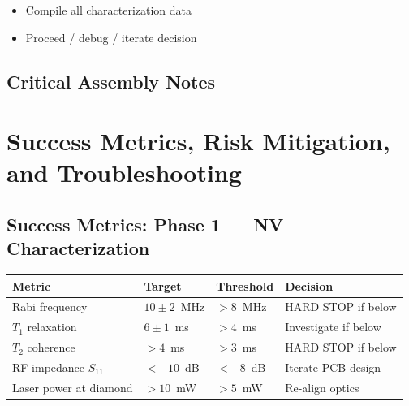 \documentclass[11pt,a4paper,openany]{book}
\begin{document}
\begin{itemize}[nosep]
  \item Compile all characterization data
  \item Proceed / debug / iterate decision
\end{itemize}

\section{Critical Assembly Notes}




\chapter{Success Metrics, Risk Mitigation, and Troubleshooting}\label{ch:metrics}

\section{Success Metrics: Phase 1 --- NV Characterization}

\begin{center}
\begin{tabularx}{\textwidth}{|l|l|l|X|}
\hline
\textbf{Metric} & \textbf{Target} & \textbf{Threshold} & \textbf{Decision} \\
\hline
Rabi frequency & $10 \pm 2$~MHz & $> 8$~MHz & HARD STOP if below \\
\hline
$T_1$ relaxation & $6 \pm 1$~ms & $> 4$~ms & Investigate if below \\
\hline
$T_2$ coherence & $> 4$~ms & $> 3$~ms & HARD STOP if below \\
\hline
RF impedance $S_{11}$ & $< -10$~dB & $< -8$~dB & Iterate PCB design \\
\hline
Laser power at diamond & $> 10$~mW & $> 5$~mW & Re-align optics \\
\hline
\end{tabularx}
\end{center}
\end{document}
